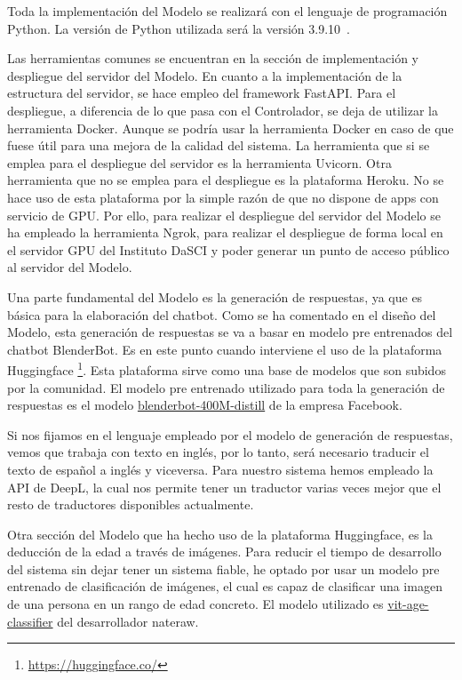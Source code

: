 Toda la implementación del Modelo se realizará con el lenguaje de programación Python. La versión de Python utilizada será la versión 3.9.10\ .

Las herramientas comunes se encuentran en la sección de implementación y despliegue del servidor del Modelo. En cuanto a la implementación de la estructura del servidor, se hace empleo del framework FastAPI. Para el despliegue, a diferencia de lo que pasa con el Controlador, se deja de utilizar la herramienta Docker. Aunque se podría usar la herramienta Docker en caso de que fuese útil para una mejora de la calidad del sistema. La herramienta que si se emplea para el despliegue del servidor es la herramienta Uvicorn. Otra herramienta que no se emplea para el despliegue es la plataforma Heroku. No se hace uso de esta plataforma por la simple razón de que no dispone de apps con servicio de GPU. Por ello, para realizar el despliegue del servidor del Modelo se ha empleado la herramienta Ngrok, para realizar el despliegue de forma local en el servidor GPU del Instituto DaSCI y poder generar un punto de acceso público al servidor del Modelo.

Una parte fundamental del Modelo es la generación de respuestas, ya que es básica para la elaboración del chatbot. Como se ha comentado en el diseño del Modelo, esta generación de respuestas se va a basar en modelo pre entrenados del chatbot BlenderBot. Es en este punto cuando interviene el uso de la plataforma Huggingface \footnote{\url{https://huggingface.co/}}. Esta plataforma sirve como una base de modelos que son subidos por la comunidad. El modelo pre entrenado utilizado para toda la generación de respuestas es el modelo \href{https://huggingface.co/facebook/blenderbot-400M-distill}{blenderbot-400M-distill} de la empresa Facebook.

Si nos fijamos en el lenguaje empleado por el modelo de generación de respuestas, vemos que trabaja con texto en inglés, por lo tanto, será necesario traducir el texto de español a inglés y viceversa. Para nuestro sistema hemos empleado la API de DeepL, la cual nos permite tener un traductor varias veces mejor que el resto de traductores disponibles actualmente.

Otra sección del Modelo que ha hecho uso de la plataforma Huggingface, es la deducción de la edad a través de imágenes. Para reducir el tiempo de desarrollo del sistema sin dejar tener un sistema fiable, he optado por usar un modelo pre entrenado de clasificación de imágenes, el cual es capaz de clasificar una imagen de una persona en un rango de edad concreto. El modelo utilizado es \href{https://huggingface.co/nateraw/vit-age-classifier}{vit-age-classifier} del desarrollador nateraw.

